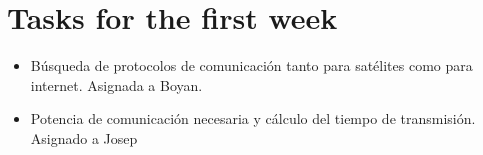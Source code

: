 \documentclass[12pt,a4paper]{report}
\author{Eva María Urbano González}
\begin{document}
\section{Tasks for the first week}
\begin{itemize}
\item Búsqueda de protocolos de comunicación tanto para satélites como para internet. Asignada a Boyan.
\item Potencia de comunicación necesaria y cálculo del tiempo de transmisión. Asignado a Josep 
\end{itemize}
\end{document}
